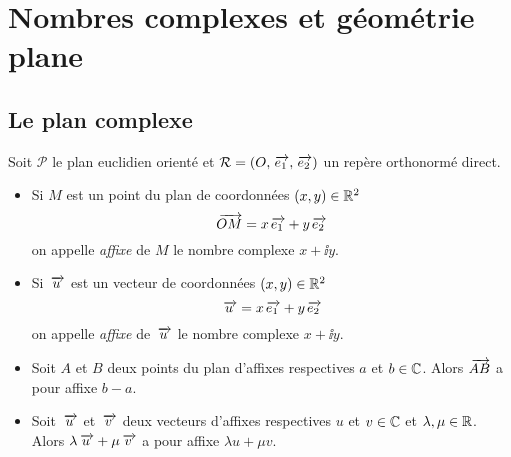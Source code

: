 \documentclass{magnolia}
\begin{document}
\section{Nombres complexes et géométrie plane}

\subsection{Le plan complexe}
\begin{definition}
Soit $\mathcal{P}$ le plan euclidien orienté et $\mathcal{R}=\p{O,\ve{e_1},\ve{e_2}}$ un repère orthonormé direct.
\begin{itemize}
\item Si $M$ est un point du plan de coordonnées $(x,y)\in\R^2$
  \[\ve{OM}=x \ve{e_1}+y \ve{e_2}\]
  on appelle \emph{affixe} de $M$ le nombre complexe $x+\ii y$.
\item Si $\ve{u}$ est un vecteur de coordonnées $(x,y)\in\R^2$
  \[\ve{u}=x \ve{e_1}+y \ve{e_2}\]
  on appelle \emph{affixe} de $\ve{u}$ le nombre complexe $x+\ii y$.
\end{itemize}
\end{definition}

\begin{proposition}
\begin{itemize}
\item Soit $A$ et $B$ deux points du plan d'affixes respectives $a$ et $b\in\C$. Alors $\ve{AB}$ a pour affixe $b-a$.
\item Soit $\ve{u}$ et $\ve{v}$ deux vecteurs d'affixes respectives $u$ et $v\in\C$ et $\lambda,\mu\in\R$. Alors $\lambda\ve{u}+\mu\ve{v}$ a pour affixe $\lambda u+\mu v$.
\end{itemize}
\end{proposition}

\end{document}
